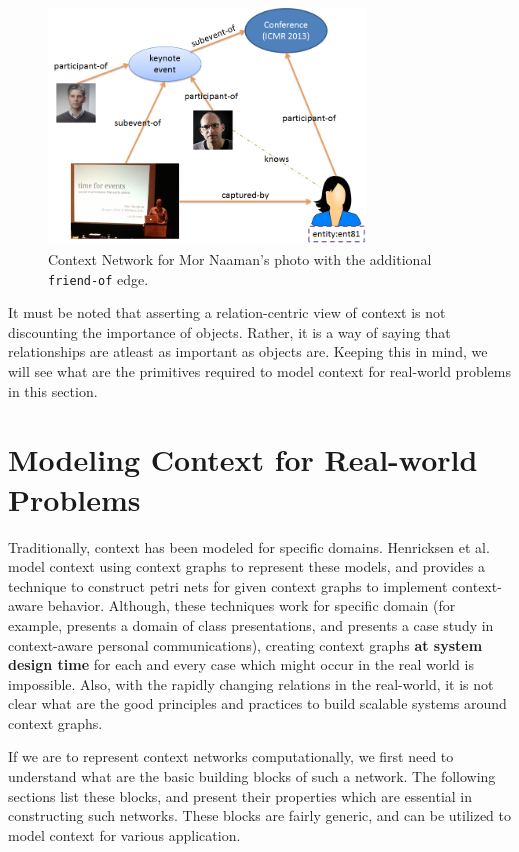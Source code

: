 \begin{figure}[h]
\centering
\includegraphics[width=0.75\textwidth]{media/chapter2/naaman-friends.png}
\caption{Context Network for Mor Naaman's photo with the additional \texttt{friend-of} edge.}
\label{fig:context-network}
\end{figure}

It must be noted that asserting a relation-centric view of context is not discounting the importance of objects. Rather, it is a way of saying that relationships are atleast as important as objects are. Keeping this in mind, we will see what are the primitives required to model context for real-world problems in this section.

\section{Modeling Context for Real-world Problems}

Traditionally, context has been modeled for specific domains. Henricksen et al.\ \cite{henricksen2002modeling} model context using context graphs to represent these models, and \cite{reignier2007context} provides a technique to construct petri nets for given context graphs to implement context-aware behavior. Although, these techniques work for specific domain (for example, \cite{reignier2007context} presents a domain of class presentations, and \cite{henricksen2002modeling} presents a case study in context-aware personal communications), creating context graphs \textbf{at system design time} for each and every case which might occur in the real world is impossible. Also, with the rapidly changing relations in the real-world, it is not clear what are the good principles and practices to build scalable systems around context graphs.

If we are to represent context networks computationally, we first need to understand what are the basic building blocks of such a network. The following sections list these blocks, and present their properties which are essential in constructing such networks. These blocks are fairly generic, and can be utilized to model context for various application.


